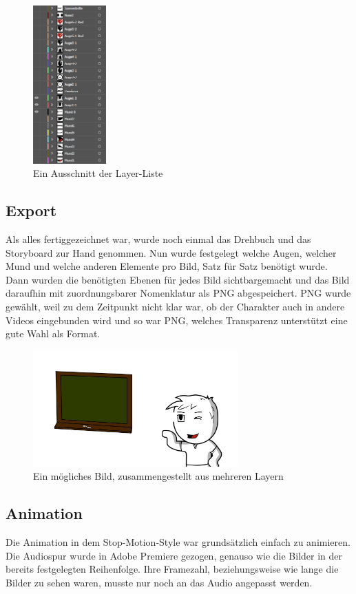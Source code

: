 \begin{figure}[H] 
  \centering
     \includegraphics[width=0.25\textwidth]{video_abb3.png}
  \caption{Ein Ausschnitt der Layer-Liste}
\end{figure}

\subsection{Export}
\renewcommand{\kapitelautor}{Autor: Niklas Kienreich}
Als alles fertiggezeichnet war, wurde noch einmal das Drehbuch und das Storyboard zur Hand genommen. Nun wurde festgelegt welche Augen, welcher Mund und welche anderen Elemente pro Bild, Satz für Satz benötigt wurde. Dann wurden die benötigten Ebenen für jedes Bild sichtbargemacht und das Bild daraufhin mit zuordnungsbarer Nomenklatur als PNG abgespeichert. PNG wurde gewählt, weil zu dem Zeitpunkt nicht klar war, ob der Charakter auch in andere Videos eingebunden wird und so war PNG, welches Transparenz unterstützt eine gute Wahl als Format.

\begin{figure}[H] 
  \centering
     \includegraphics[width=0.7\textwidth]{video_abb4.png}
  \caption{Ein mögliches Bild, zusammengestellt aus mehreren Layern}
\end{figure}

\subsection{Animation}
\renewcommand{\kapitelautor}{Autor: Niklas Kienreich}
Die Animation in dem Stop-Motion-Style war grundsätzlich einfach zu animieren. Die Audiospur wurde in Adobe Premiere gezogen, genauso wie die Bilder in der bereits festgelegten Reihenfolge. Ihre Framezahl, beziehungsweise wie lange die Bilder zu sehen waren, musste nur noch an das Audio angepasst werden.
\renewcommand{\kapitelautor}{Autor: Niklas Kienreich}
